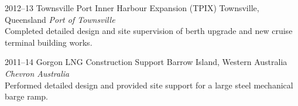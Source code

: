 \begin{entrylist}
\entry%
{2012--13}
{Townsville Port Inner Harbour Expansion (TPIX)}
{Townsville, Queensland}
{\emph{Port of Townsville} \\
Completed detailed design and site supervision of berth upgrade and new cruise terminal building works.}
\end{entrylist}


\begin{entrylist}
\entry%
{2011--14}
{Gorgon LNG Construction Support}
{Barrow Island, Western Australia}
{\emph{Chevron Australia} \\
Performed detailed design and provided site support for a large steel mechanical barge ramp.}
\end{entrylist}

